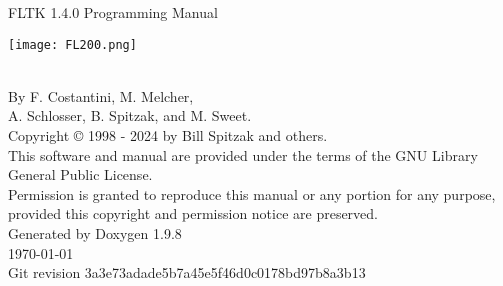 %
%
\begin{titlepage}
\vspace*{5cm}
\begin{center}%
{\Huge FLTK 1.4.0 Programming Manual}\\
\vspace*{2cm}
\begin{DoxyImageNoCaption}
 \mbox{\texttt{[image: FL200.png]}}
\end{DoxyImageNoCaption}\\
\vspace*{2cm}
{\Large
By F. Costantini, M. Melcher, \\
A. Schlosser, B. Spitzak, and M. Sweet.}\\
\vspace*{1.5cm}
{\large Copyright © 1998 - 2024 by Bill Spitzak and others.}\\
\vspace*{0.75cm}
{\small
This software and manual are provided under the terms of the GNU Library General Public License.}\\
{\small
Permission is granted to reproduce this manual or any portion for any purpose,}\\
{\small
provided this copyright and permission notice are preserved.}\\
\vspace*{1.5cm}
{\large Generated by Doxygen 1.9.8}\\
\vspace*{0.5cm}
\today{}\\
\vspace*{0.5cm}
{\small Git revision 3a3e73adade5b7a45e5f46d0c0178bd97b8a3b13}\\
\end{center}
\end{titlepage}
%
%
